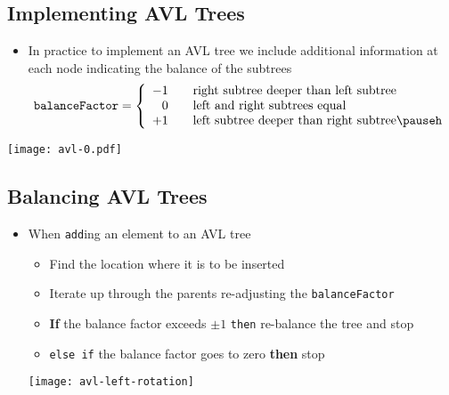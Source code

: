 \begin{slide}
\section[-2]{Implementing AVL Trees}

\pb
\begin{itemize} \small
\item In practice to implement an AVL tree we include additional
  information at each node indicating the balance of the subtrees\pauseh
  \begin{align*}
    \mbox{\texttt{balanceFactor}} = \left\{
      \begin{array}{rcl}
        -1 & & \mbox{right subtree deeper than left subtree} \\
        0  & & \mbox{left and right subtrees equal}\\
        +1 & & \mbox{left subtree deeper than right subtree}\pauseh
      \end{array}\right.
  \end{align*}
\end{itemize}
\begin{center}
  \texttt{[image: avl-0.pdf]}
\end{center}


\end{slide}


\begin{slide}
\section{Balancing AVL Trees}

\begin{PauseHighLight}
  \begin{itemize}
  \item When \texttt{add}ing an element to an AVL tree\pause
    \begin{itemize}
    \item Find the location where it is to be inserted\pause
    \item Iterate up through the parents re-adjusting the
      \texttt{balanceFactor}\pause
    \item \textbf{If} the balance factor exceeds $\pm1$ \texttt{then}
      re-balance the tree and stop\pause
    \item \texttt{else if} the balance factor goes to zero \textbf{then}
      stop\pause
    \end{itemize}
    \begin{center}
      \texttt{[image: avl-left-rotation]}\pause
    \end{center}
\end{itemize}
\end{PauseHighLight}
\end{slide}

